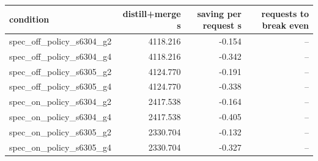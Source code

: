 \begin{tabular}{lrrr}
\toprule
condition & distill+merge s & saving per request s & requests to break even \\
\midrule
spec\_off\_policy\_s6304\_g2 & 4118.216 & -0.154 & -- \\
spec\_off\_policy\_s6304\_g4 & 4118.216 & -0.342 & -- \\
spec\_off\_policy\_s6305\_g2 & 4124.770 & -0.191 & -- \\
spec\_off\_policy\_s6305\_g4 & 4124.770 & -0.338 & -- \\
spec\_on\_policy\_s6304\_g2 & 2417.538 & -0.164 & -- \\
spec\_on\_policy\_s6304\_g4 & 2417.538 & -0.405 & -- \\
spec\_on\_policy\_s6305\_g2 & 2330.704 & -0.132 & -- \\
spec\_on\_policy\_s6305\_g4 & 2330.704 & -0.327 & -- \\
\bottomrule
\end{tabular}
